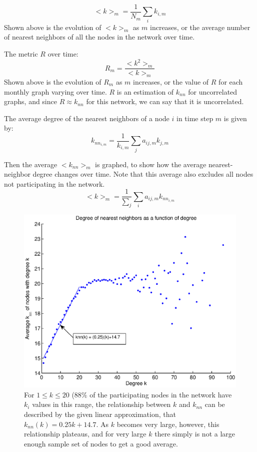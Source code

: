\documentclass[12pt]{article}
\begin{document}
\begin{equation}
<k>_m = \frac{1}{N_m}\sum_i k_{i,m} 
\end{equation}
Shown above is the evolution of \(<k>_m\) as \(m\) increases, or the average number of nearest neighbors of all the nodes in the network over time.

The metric \(R\) over time:
\begin{equation}
R_m = \frac{<k^2>_m}{<k>_m}
\end{equation}
Shown above is the evolution of \(R_m\) as \(m\) increases, or the value of \(R\) for each monthly graph varying over time. \(R\) is an estimation of \(k_{nn}\) for uncorrelated graphs, and since \(R \approx k_{nn}\) for this network, we can say that it is uncorrelated.

The average degree of the nearest neighbors of a node \(i\) in time step \(m\) is given by:
\begin{equation}
k_{{nn}_{i,m}} = \frac{1}{k_{i,m}} \sum_{j}  a_{ij,m}  k_{j,m}
\end{equation}

Then the average \(<k_{nn}>_m\) is graphed, to show how the average nearest-neighbor degree changes over time. Note that this average also excludes all nodes not participating in the network.
\begin{equation}
<k>_m = \frac{1}{\sum_j }\sum_i a_{ij,m} k_{{nn}_{i,m}}
\end{equation}

\begin{figure}[H]
\includegraphics[width = 1\textwidth]{Graficos/knnvskA.eps}
\caption{For \( 1 \leq k \leq 20\) (\(88\%\) of the participating nodes in the network have \(k_i\) values in this range, the relationship between \(k\) and \(k_{nn}\) can be described by the given linear approximation, that \(k_{nn}(k) = 0.25k + 14.7\). As \(k\) becomes very large, however, this relationship plateaus, and for very large \(k\) there simply is not a large enough sample set of nodes to get a good average.}
\label{fig:knnvsk}
\end{figure}
\end{document}
